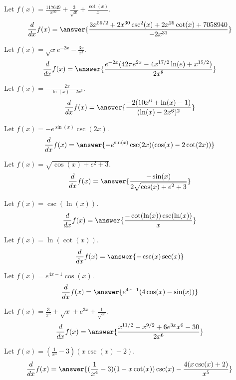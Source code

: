 \documentclass{ximera}
\begin{document}
\begin{shuffle}
\begin{exercise}
Let $f(x)=\frac{117649}{x^{30}}+\frac{3}{\sqrt{x}}+\frac{\cot (x)}{x}$.
\[
\ddx f(x) = \answer{\frac{3 x^{59/2}+2 x^{30} \csc ^2(x)+2 x^{29} \cot (x)+7058940}{-2 x^{31}}}
\]
\end{exercise}

\begin{exercise}
Let $f(x)=\sqrt{x} e^{-2 x}-\frac{3 \pi }{x^7}$.
\[
\ddx f(x) = \answer{\frac{e^{-2 x} (42 \pi  e^{2 x}-4 x^{17/2} \ln (e)+x^{15/2})}{2 x^8}}
\]
\end{exercise}

\begin{exercise}
Let $f(x)=-\frac{2 x}{\ln (x)-2 x^6}$.
\[
\ddx f(x) = \answer{\frac{-2 (10 x^6+\ln (x)-1)}{(\ln (x)-2 x^6)^2}}
\]
\end{exercise}

\begin{exercise}
Let $f(x)=-e^{\sin (x)} \csc (2 x)$.
\[
\ddx f(x) = \answer{-e^{\sin (x)} \csc (2 x) (\cos (x)-2 \cot (2 x))}
\]
\end{exercise}

\begin{exercise}
Let $f(x)=\sqrt{\cos (x)+e^2+3}$.
\[
\ddx f(x) = \answer{\frac{-\sin (x)}{2 \sqrt{\cos (x)+e^2+3}}}
\]
\end{exercise}

\begin{exercise}
Let $f(x)=\csc (\ln (x))$.
\[
\ddx f(x) = \answer{\frac{-\cot (\ln (x)) \csc (\ln (x))}{x}}
\]
\end{exercise}

\begin{exercise}
Let $f(x)=\ln (\cot (x))$.
\[
\ddx f(x) = \answer{-\csc (x) \sec (x)}
\]
\end{exercise}

\begin{exercise}
Let $f(x)=e^{4 x-1} \cos (x)$.
\[
\ddx f(x) = \answer{e^{4 x-1} (4 \cos (x)-\sin (x))}
\]
\end{exercise}

\begin{exercise}
Let $f(x)=\frac{3}{x^5}+\sqrt{x}+e^{3 x}+\frac{1}{\sqrt{x}}$.
\[
\ddx f(x) = \answer{\frac{x^{11/2}-x^{9/2}+6 e^{3 x} x^6-30}{2 x^6}}
\]
\end{exercise}

\begin{exercise}
Let $f(x)=(\frac{1}{x^4}-3) (x \csc (x)+2)$.
\[
\ddx f(x) = \answer{(\frac{1}{x^4}-3) (1-x \cot (x)) \csc (x)-\frac{4 (x \csc (x)+2)}{x^5}}
\]
\end{exercise}


\end{shuffle}
\end{document}
